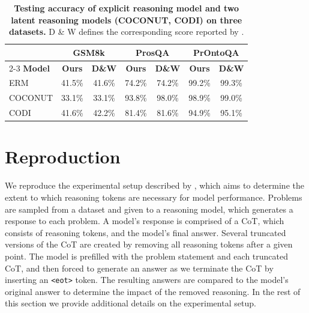 \documentclass[11pt]{article}
\begin{document}
\begin{table}[]
  \centering
  \begin{tabular}{l cc cc cc}
    \hline
    & \multicolumn{2}{c}{\textbf{GSM8k}} & \multicolumn{2}{c}{\textbf{ProsQA}} & \multicolumn{2}{c}{\textbf{PrOntoQA}} \\
    \cline{2-3} \cline{4-5} \cline{6-7}
    \textbf{Model} & \textbf{Ours} & \textbf{D\&W} & \textbf{Ours} & \textbf{D\&W} & \textbf{Ours} & \textbf{D\&W} \\
    \hline
    ERM        & 41.5\%       & 41.6\%       & 74.2\% & 74.2\% & 99.2\% & 99.3\% \\
    COCONUT    & 33.1\%       & 33.1\%       & 93.8\% & 98.0\% & 98.9\% & 99.0\% \\
    CODI       & 41.6\%   & 42.2\%   & 81.4\% & 81.6\% & 94.9\% & 95.1\% \\
    \hline
  \end{tabular}
  \caption{\textbf{Testing accuracy of explicit reasoning model and two latent reasoning models (COCONUT, CODI) on three datasets.} D \& W defines the corresponding score reported by \citet{dilgren2026latent}.}
  \label{tab:performance}
\end{table}

\section{Reproduction}
\label{sec:experiment}

We reproduce the experimental setup described by \citet{dilgren2026latent}, which aims to determine the extent to which reasoning tokens are necessary for model performance. Problems are sampled from a dataset and given to a reasoning model, which generates a response to each problem. A model's response is comprised of a CoT, which consists of reasoning tokens, and the model's final answer. Several truncated versions of the CoT are created by removing all reasoning tokens after a given point. The model is prefilled with the problem statement and each truncated CoT, and then forced to generate an answer as we terminate the CoT by inserting an \verb|<eot>| token. The resulting answers are compared to the model's original answer to determine the impact of the removed reasoning. In the rest of this section we provide additional details on the experimental setup.

\end{document}
